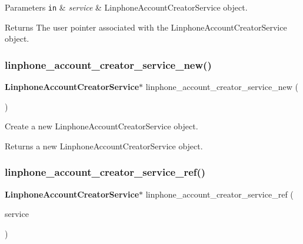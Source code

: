 \begin{DoxyParams}[1]{Parameters}
\mbox{\tt in}  & {\em service} & Linphone\+Account\+Creator\+Service object. \\
\hline
\end{DoxyParams}
\begin{DoxyReturn}{Returns}
The user pointer associated with the Linphone\+Account\+Creator\+Service object.  
\end{DoxyReturn}
\mbox{\label{group__account__creator__request_ga259bdb0aa71173151a372a673c388232}} 
\subsubsection{linphone\+\_\+account\+\_\+creator\+\_\+service\+\_\+new()}
{\footnotesize\ttfamily \textbf{ Linphone\+Account\+Creator\+Service}$\ast$ linphone\+\_\+account\+\_\+creator\+\_\+service\+\_\+new (\begin{DoxyParamCaption}\item[{void}]{ }\end{DoxyParamCaption})}



Create a new Linphone\+Account\+Creator\+Service object. 

\begin{DoxyReturn}{Returns}
a new Linphone\+Account\+Creator\+Service object.  
\end{DoxyReturn}
\mbox{\label{group__account__creator__request_gaef5593c284868cca7892608fd231dbae}} 
\subsubsection{linphone\+\_\+account\+\_\+creator\+\_\+service\+\_\+ref()}
{\footnotesize\ttfamily \textbf{ Linphone\+Account\+Creator\+Service}$\ast$ linphone\+\_\+account\+\_\+creator\+\_\+service\+\_\+ref (\begin{DoxyParamCaption}\item[{\textbf{ Linphone\+Account\+Creator\+Service} $\ast$}]{service }\end{DoxyParamCaption})}



